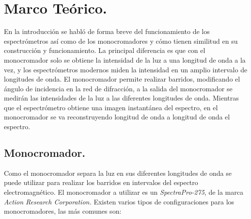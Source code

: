 \chapter{Marco Teórico.}
En la introducción se habló de forma breve del funcionamiento de los espectrómetros así como de los monocromadores y cómo tienen similitud en su construcción y funcionamiento. La principal diferencia es que con el monocromador solo se obtiene la intensidad de la luz a una longitud de onda a la vez, y los espectrómetros modernos miden la intensidad en un amplio intervalo de longitudes de onda. El monocromador permite realizar barridos, modificando el ángulo de incidencia en la red de difracción, a la salida del monocromador se medirán las intensidades de la luz a las diferentes longitudes de onda. Mientras que el espectrómetro obtiene una imagen instantánea del espectro, en el monocromador se va reconstruyendo longitud de onda a longitud de onda el espectro.

\section{Monocromador.}
Como el monocromador separa la luz en sus diferentes longitudes de onda se puede utilizar para realizar los barridos en intervalos del espectro electromagnético. 
El monocromador a utilizar es un \textit{SpectraPro-275}, de la marca \textit{Action Research Corporation.}
Existen varios tipos de configuraciones para los monocromadores, las más comunes son:

